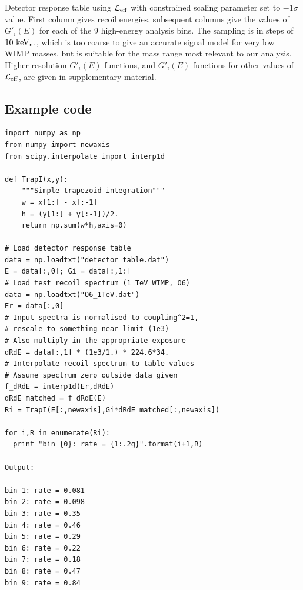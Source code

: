 \begin{table}
{
  \lstset{tabsize=4,basicstyle=\tiny\ttfamily,columns=flexible,emptylines=10000,keepspaces=true}
  
}
\caption{Detector response table using $\mathcal{L}_{\mathrm{eff}}$ with constrained scaling parameter set to $-1\sigma$ value. First column gives recoil energies, subsequent columns give the values of $G'_i(E)$ for each of the 9 high-energy analysis bins. The sampling is in steps of $10~\mathrm{keV_\mathrm{nr}}$, which is too coarse to give an accurate signal model for very low WIMP masses, but is suitable for the mass range most relevant to our analysis. Higher resolution $G'_i(E)$ functions, and $G'_i(E)$ functions for other values of $\mathcal{L}_{\mathrm{eff}}$, are given in supplementary material. 
\label{tab:smeartable_highE}
}
\end{table}  
\newpage
\subsection{Example code}
\label{app:example_code}
\begin{lstlisting}
import numpy as np
from numpy import newaxis
from scipy.interpolate import interp1d

def TrapI(x,y):
    """Simple trapezoid integration"""
    w = x[1:] - x[:-1]
    h = (y[1:] + y[:-1])/2.
    return np.sum(w*h,axis=0)

# Load detector response table
data = np.loadtxt("detector_table.dat")
E = data[:,0]; Gi = data[:,1:]
# Load test recoil spectrum (1 TeV WIMP, O6)
data = np.loadtxt("O6_1TeV.dat")
Er = data[:,0]
# Input spectra is normalised to coupling^2=1,
# rescale to something near limit (1e3)
# Also multiply in the appropriate exposure
dRdE = data[:,1] * (1e3/1.) * 224.6*34.
# Interpolate recoil spectrum to table values
# Assume spectrum zero outside data given
f_dRdE = interp1d(Er,dRdE)
dRdE_matched = f_dRdE(E)
Ri = TrapI(E[:,newaxis],Gi*dRdE_matched[:,newaxis])

for i,R in enumerate(Ri):
  print "bin {0}: rate = {1:.2g}".format(i+1,R)

Output:

bin 1: rate = 0.081
bin 2: rate = 0.098
bin 3: rate = 0.35
bin 4: rate = 0.46
bin 5: rate = 0.29
bin 6: rate = 0.22
bin 7: rate = 0.18
bin 8: rate = 0.47
bin 9: rate = 0.84
\end{lstlisting}


